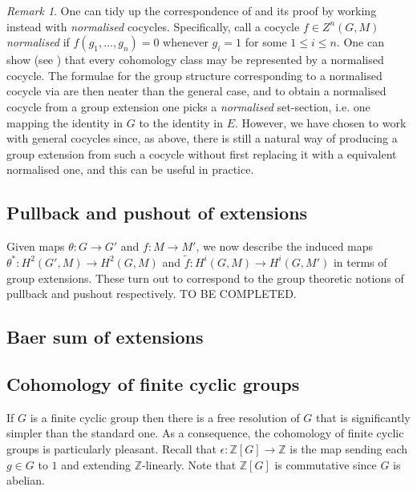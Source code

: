 \documentclass[11pt]{amsart}
\numberwithin{equation}{section}
\theoremstyle{remark}
\newtheorem{remark}[equation]{Remark}
\theoremstyle{remark}
\theoremstyle{remark}
\theoremstyle{definition}
\theoremstyle{definition}
\theoremstyle{definition}
\theoremstyle{definition}
\theoremstyle{definition}
\theoremstyle{definition}
\begin{document}
\begin{remark}
One can tidy up the correspondence of  and its proof by working instead with \textit{normalised} cocycles. Specifically,  call a cocycle $f\in Z^n(G,M)$ \textit{normalised} if $f(g_1,...,g_n)=0$ whenever $g_i=1$ for some $1\leq i \leq n$. One can show (see \cite[Example 3.2.5]{MR2266528}) that every cohomology class may be represented by a normalised cocycle. The formulae for the group structure corresponding to a normalised cocycle via  are then neater than the general case, and to obtain a normalised cocycle from a group extension one picks a \textit{normalised} set-section, i.e.  one mapping the identity in $G$  to the identity in $E$. However, we have chosen to work with general cocycles since, as above, there is still a natural way of producing a group extension from such a cocycle without first replacing it with a equivalent normalised one, and this can be useful in practice.
\end{remark}

\subsection{Pullback and pushout of extensions}

Given maps $\theta:G\rightarrow G'$ and $f:M\rightarrow M'$, we now describe the induced maps $\theta^*:H^2(G',M)\rightarrow H^2(G,M)$ and $\tilde{f}:H^i(G,M)\rightarrow H^i(G,M')$  in terms of group extensions. These turn out to correspond to the group theoretic notions of pullback and pushout respectively. TO BE COMPLETED.

\subsection{Baer sum of extensions}

\subsection{Cohomology of finite cyclic groups}

If $G$ is a finite cyclic group then there is a free resolution of $G$ that is significantly simpler than the standard one. As a consequence, the cohomology of finite cyclic groups is particularly pleasant. Recall that $\epsilon:\mathbb{Z}[G]\rightarrow \mathbb{Z}$ is the map sending each $g\in G$ to $1$ and extending $\mathbb{Z}$-linearly. Note that $\mathbb{Z}[G]$ is commutative since $G$ is abelian.
\end{document}
